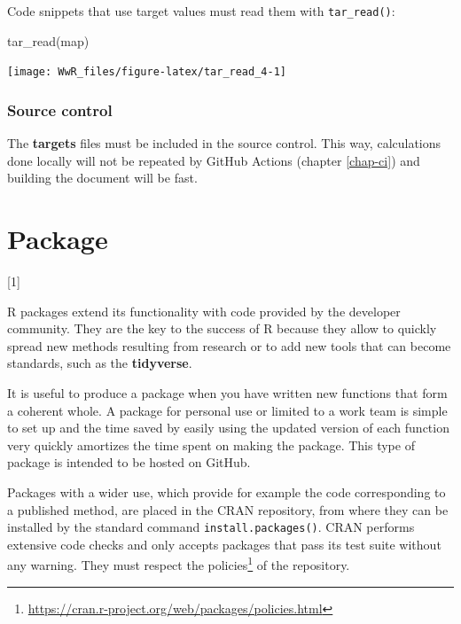 \documentclass[
  12pt,
  american,
  a4paper,
  extrafontsizes,onecolumn,openright
  ]{memoir}
\newenvironment{Shaded}{\begin{snugshade}}{\end{snugshade}}
\newcommand{\FunctionTok}[1]{\textcolor[rgb]{0.00,0.00,0.00}{#1}}
\newcommand{\NormalTok}[1]{#1}
\newlength{\rf}
\newcommand{\toc}[1]{%
  \startcontents[chapters]%
  \printcontents[chapters]{}{1}[#1]{}%
  ~\newline%
}
\begin{document}
Code snippets that use target values must read them with \texttt{tar\_read()}:

\scriptsize

\begin{Shaded}
\begin{Highlighting}[]
\FunctionTok{tar\_read}\NormalTok{(map)}
\end{Highlighting}
\end{Shaded}

\begin{center}\texttt{[image: WwR\_files/figure-latex/tar\_read\_4-1]} \end{center}

\normalsize

\hypertarget{source-control-1}{%
\subsection{Source control}\label{source-control-1}}

The \textbf{targets} files must be included in the source control.
This way, calculations done locally will not be repeated by GitHub Actions (chapter \ref{chap-ci}) and building the document will be fast.

\hypertarget{chap-package}{%
\chapter{Package}\label{chap-package}}

\toc{1}

R packages extend its functionality with code provided by the developer community.
They are the key to the success of R because they allow to quickly spread new methods resulting from research or to add new tools that can become standards, such as the \textbf{tidyverse}.

It is useful to produce a package when you have written new functions that form a coherent whole.
A package for personal use or limited to a work team is simple to set up and the time saved by easily using the updated version of each function very quickly amortizes the time spent on making the package.
This type of package is intended to be hosted on GitHub.

Packages with a wider use, which provide for example the code corresponding to a published method, are placed in the CRAN repository, from where they can be installed by the standard command \texttt{install.packages()}.
CRAN performs extensive code checks and only accepts packages that pass its test suite without any warning.
They must respect the policies\footnote{\url{https://cran.r-project.org/web/packages/policies.html}} of the repository.
\end{document}
